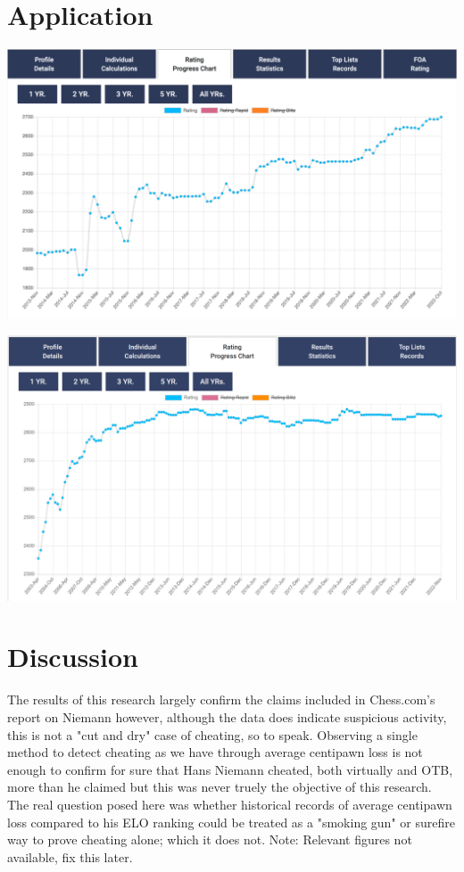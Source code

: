 \documentclass[12pt]{article}
\begin{document}
\section*{Application}
\label{sec:app}


\includegraphics[scale=0.3]{niemann_rating.png}

\includegraphics[scale=0.5]{carlsen_rating.png}


\section*{Discussion}
\label{sec:disc}

The results of this research largely confirm the claims included in Chess.com's report on Niemann however, although the data does indicate suspicious activity, this is not a "cut and dry" case of cheating, so to speak. Observing a single method to detect cheating as we have through average centipawn loss is not enough to confirm for sure that Hans Niemann cheated, both virtually and OTB, more than he claimed but this was never truely the objective of this research. The real question posed here was whether historical records of average centipawn loss compared to his ELO ranking could be treated as a "smoking gun" or surefire way to prove cheating alone; which it does not. Note: Relevant figures not available, fix this later. 
\end{document}
